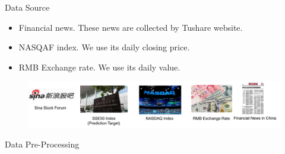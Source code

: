 \documentclass[final,hyperref={pdfpagelabels=false}]{beamer}
\begin{document}
\begin{frame}[t]
\begin{columns}[t]
\begin{column}{.445\textwidth}
\begin{block}{Data Source}
\begin{itemize}



\item Financial news. These news are collected by Tushare website.
\item NASQAF index. We use its daily closing price.
\item RMB Exchange rate. We use its daily value.
\end{itemize}

\centering
\begin{figure}
\includegraphics[width=1.0\linewidth]{datasource.png}
\label{sample}
\end{figure}

\end{block}


\begin{block}{Data Pre-Processing}


\end{block}
\end{column}
\end{columns}
\end{frame}
\end{document}
